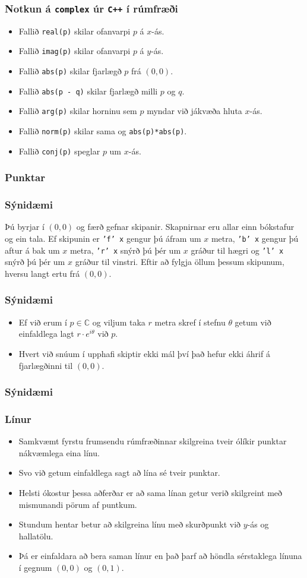 \documentclass{beamer}
\newcommand\env[2]
{
	\begin{#1}
	#2
	\end{#1}
}
\newcommand\code[1]{\tiny}
\begin{document}
\env{frame}
{
	\frametitle{Notkun á \texttt{complex} úr \texttt{C++} í rúmfræði}
	\env{itemize}
	{
		\item<1-> Fallið \texttt{real(p)} skilar ofanvarpi $p$ á $x$-ás.
		\item<2-> Fallið \texttt{imag(p)} skilar ofanvarpi $p$ á $y$-ás.
		\item<3-> Fallið \texttt{abs(p)} skilar fjarlægð $p$ frá $(0, 0)$.
		\item<4-> Fallið \texttt{abs(p - q)} skilar fjarlægð milli $p$ og $q$.
		\item<5-> Fallið \texttt{arg(p)} skilar horninu sem $p$ myndar við jákvæða hluta $x$-ás.
		\item<6-> Fallið \texttt{norm(p)} skilar sama og \texttt{abs(p)*abs(p)}.
		\item<7-> Fallið \texttt{conj(p)} speglar $p$ um $x$-ás.
	}
}

\begin{frame}[fragile]
	\frametitle{Punktar}
	\code{point.h}
\end{frame}

\env{frame}
{
	\frametitle{Sýnidæmi}
	Þú byrjar í $(0, 0)$ og færð gefnar skipanir. Skapnirnar eru allar einn bókstafur og ein tala.
	Ef skipunin er \texttt{'f' x} gengur þú áfram um $x$ metra, \texttt{'b' x} gengur þú aftur á bak
	um $x$ metra, \texttt{'r' x} snýrð þú þér um $x$ gráður til hægri og \texttt{'l' x} snýrð þú
	þér um $x$ gráður til vinstri. Eftir að fylgja öllum þessum skipunum, hversu langt ertu frá
	$(0, 0)$.
}

\env{frame}
{
	\frametitle{Sýnidæmi}
	\env{itemize}
	{
	\item<1-> Ef við erum í $p \in \mathbb{C}$ og viljum taka $r$ metra skref í stefnu $\theta$ getum
		við einfaldlega lagt $r\cdot e^{i\theta}$ við $p$.
	\item<2-> Hvert við snúum í upphafi skiptir ekki mál því það hefur ekki áhrif á fjarlægðinni til $(0, 0)$.
	}
}

\begin{frame}[fragile]
	\frametitle{Sýnidæmi}
	\code{kindalogo.cpp}
\end{frame}

\env{frame}
{
	\frametitle{Línur}
	\env{itemize}
	{
		\item<1-> Samkvæmt fyrstu frumsendu rúmfræðinnar skilgreina tveir ólíkir punktar nákvæmlega eina línu.
		\item<2-> Svo við getum einfaldlega sagt að lína sé tveir punktar.
		\item<3-> Helsti ókostur þessa aðferðar er að sama línan getur verið skilgreint með mismunandi pörum af puntkum.
		\item<4-> Stundum hentar betur að skilgreina línu með skurðpunkt við $y$-ás og hallatölu. 
		\item<5-> Þá er einfaldara að bera saman línur en það þarf að höndla sérstaklega línuna í gegnum $(0, 0)$ og $(0, 1)$.
	}
}
\end{document}
